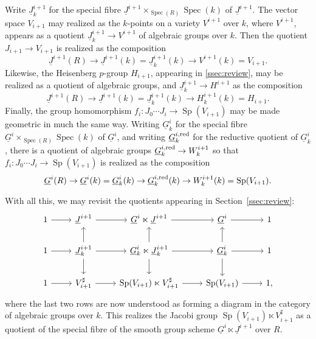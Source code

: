 \documentclass[10pt]{amsart}
\theoremstyle{plain}
\theoremstyle{definition}
\newcommand{\Fq}{k}
\newcommand{\Spec}[1]{{\operatorname{Spec}(#1)}}
\newcommand{\Sp}{{\operatorname{Sp}}}
\begin{document}
Write $\underline{J}^{i+1}_\Fq$ for the special fibre $\underline{J}^{i+1}\times_{\Spec{R}} \Spec{k}$ of $\underline{J}^{i+1}$. 
The vector space $V_{i+1}$ may realized as the $\Fq$-points on a variety $V^{i+1}$ over $\Fq$, where $V^{i+1}$, appears as a quotient $\underline{J}^{i+1}_{\Fq} \to V^{i+1}$ of algebraic groups over $\Fq$. Then the quotient $J_{i+1} \to V_{i+1}$ is realized as the composition
\[
\underline{J}^{i+1}(R) \to \underline{J}^{i+1}(\Fq) = \underline{J}^{i+1}_\Fq(\Fq) \to V^{i+1}(\Fq) = V_{i+1}.
\]
Likewise, the Heisenberg $p$-group $H_{i+1}$, appearing in \ref{ssec:review}, may be realized as a quotient of algebraic groups, and $\underline{J}^{i+1}_{\Fq} \to H^{i+1}$ as the composition 
\[
\underline{J}^{i+1}(R) \to \underline{J}^{i+1}(\Fq) = \underline{J}^{i+1}_\Fq(\Fq) \to H^{i+1}_{\Fq}(\Fq) = H_{i+1}.
\]
Finally, the group homomorphism $f_i : J_0\cdots J_i \to \Sp(V_{i+1})$ may be made geometric in much the same way. 
Writing $\underline{G}^{i}_\Fq$ for the special fibre $\underline{G}^{i}\times_{\Spec{R}} \Spec{k}$ of $\underline{G}^{i}$, and writing $\underline{G}^{i,\reductive}_\Fq$ for the reductive quotient of $\underline{G}^{i}_\Fq$, there is a quotient of algebraic groups $\underline{G}^{i,\reductive}_\Fq \to W^{i+1}_\Fq$ so that $f_i : J_0\cdots J_i \to \Sp(V_{i+1})$ is realized as the composition
\[
\underline{G}^{i}(R) \to \underline{G}^{i}(\Fq) = \underline{G}^{i}_\Fq(\Fq) \to  \underline{G}^{i,\reductive}_\Fq(\Fq) \to W^{i+1}_{\Fq}(\Fq) = \Sp(V_{i+1}).
\]

With all this, we may revisit the quotients appearing in Section~\ref{ssec:review}:
\[
\begin{tikzcd}
1 \arrow{r} & \underline{J}^{i+1}  \arrow{r} & \underline{G}^i \ltimes \underline{J}^{i+1} \arrow{r} & \underline{G}^i \arrow{r}  & 1\\
1 \arrow{r} & \underline{J}^{i+1}_\Fq \arrow{d} \arrow{u} \arrow{r} & \underline{G}_\Fq^i \ltimes \underline{J}_\Fq^{i+1} \arrow{d} \arrow{u} \arrow{r} & \underline{G}_\Fq^i \arrow{r} \arrow{d} \arrow{u} & 1\\ 
1 \arrow{r} & V_{i+1}^\sharp \arrow{r} & \Sp(V_{i+1}) \ltimes V_{i+1}^\sharp \arrow{r} & \Sp(V_{i+1}) \arrow{r} & 1,
\end{tikzcd}
\]
where the last two rows are now understood as forming a diagram in the category of algebraic groups over $\Fq$. 
This realizes the Jacobi group $\Sp(V_{i+1}) \ltimes V_{i+1}^\sharp$ as a quotient of the special fibre of the smooth group scheme $\underline{G}^i \ltimes \underline{J}^{i+1}$ over $R$. 
\end{document}
